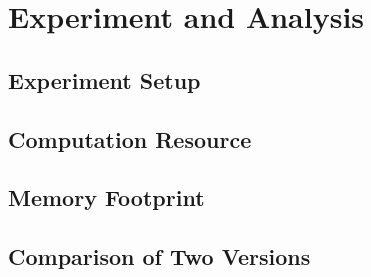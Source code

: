 \section{Experiment and Analysis}
\label{sec:experiment}

\subsection{Experiment Setup}

\subsection{Computation Resource}

\subsection{Memory Footprint}

\subsection{Comparison of Two Versions}
